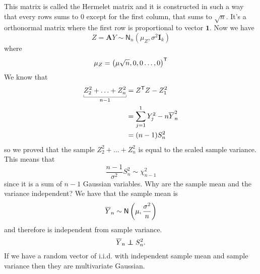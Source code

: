 \documentclass[12pt]{report}
\begin{document}
This matrix is called the Hermelet matrix and it is constructed in such a way that every rows sums to 0 except for the first column, that sums to $\sqrt{n}$. It's a orthonormal matrix where the first row is proportional to vector $\mathbf{1}$. Now we have
\begin{equation*}
	Z=\mathbf{A}Y\sim\mathsf{N}_{n}\left(\mu_{Z},\sigma^{2}\mathbf{I}_{k}\right)
\end{equation*}
where
\begin{equation*}
	\mu_{Z}=\left(\mu\sqrt{n},0,0\ldots,0\right)^{\mathsf{T}}
\end{equation*}
We know that
\begin{align*}
	\ubracketthin{Z_{2}^{2}+\ldots+Z_{n}^{2}}_{n-1}&=Z^{\trsp}Z-Z_{1}^{2}\\
	&=\sum_{j=1}^{1}Y^{2}_{j}-n\Ybar_{n}^{2}\\
	&=(n-1)S^{2}_{n}
\end{align*}
so we proved that the sample \rv{} $Z_{2}^{2}+\ldots+Z^{2}_{n}$ is equal to the scaled sample variance. This means that
\begin{equation*}
	\frac{n-1}{\sigma^{2}}S^{2}_{n}\sim\chi^{2}_{n-1}
\end{equation*}
since it is a sum of $n-1$ Gaussian variables.
Why are the sample mean and the variance independent? We have that the sample mean is
\begin{equation*}
	\overline{Y}_{n}\sim\mathsf{N}\left(\mu,\frac{\sigma^{2}}{n}\right)
\end{equation*}
and therefore is independent from sample variance.
\begin{equation*}
	\Ybar_{n}\indep S^{2}_{n}.
\end{equation*}
If we have a random vector of i.i.d. \rv{} with independent sample mean and sample variance then they are multivariate Gaussian. 
\end{document}

